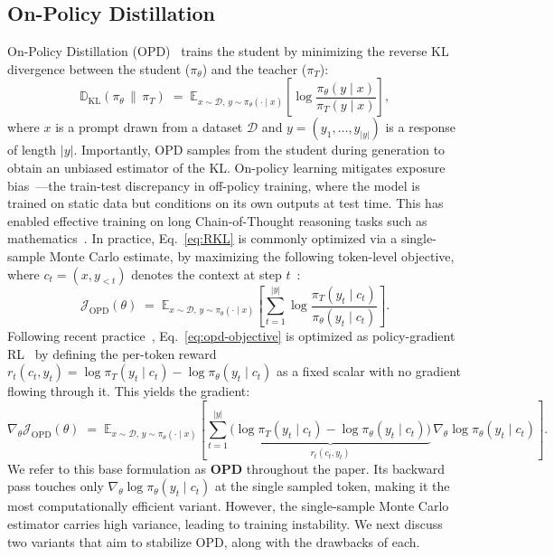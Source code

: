 \documentclass{article}
\begin{document}
\subsection{On-Policy Distillation}
\label{sec:opd}
On-Policy Distillation (OPD)~\citep{agarwal2024onpolicy,gu2024minillm} trains the student by minimizing the reverse KL divergence between the student ($\pi_\theta$) and the teacher ($\pi_T$):
\begin{equation}
\label{eq:RKL}
\mathbb{D}_\mathrm{KL}\!\left(\pi_\theta \,\|\, \pi_T\right)
\;=\;
\mathbb{E}_{x\sim \mathcal{D},\, y\sim \pi_\theta(\cdot\mid x)}
\!\left[\log \frac{\pi_\theta(y\mid x)}{\pi_T(y\mid x)}\right],
\end{equation}
where $x$ is a prompt drawn from a dataset $\mathcal{D}$ and $y = (y_1, \ldots, y_{|y|})$ is a response of length $|y|$. Importantly, OPD samples from the student during generation to obtain an unbiased estimator of the KL.  On-policy learning mitigates exposure bias~\citep{ranzato2015exposurebias}---the train-test discrepancy in off-policy training, where the model is trained on static data but conditions on its own outputs at test time. This has enabled effective training on long Chain-of-Thought reasoning tasks such as mathematics~\citep{wei2022chain,yang2025qwen3,lu2025onpolicydistillation}. In practice, Eq.~\eqref{eq:RKL} is commonly optimized via a single-sample Monte Carlo estimate, by maximizing the following token-level objective, where $c_t = (x, y_{<t})$ denotes the context at step $t$~\citep{lu2025onpolicydistillation}:
\begin{equation}
\label{eq:opd-objective}
\mathcal{J}_\text{OPD}(\theta)
\;=\;
\mathbb{E}_{x\sim\mathcal{D},\, y \sim \pi_\theta(\cdot\mid x)}
\!\left[\sum_{t=1}^{|y|} \log \frac{\pi_T(y_t \mid c_t)}{\pi_\theta(y_t \mid c_t)}\right].
\end{equation}
Following recent practice~\citep{lu2025onpolicydistillation, zeng2026glm, ko2026scaling}, Eq.~\eqref{eq:opd-objective} is optimized as policy-gradient 
RL~\citep{williams1992simple, sutton1999policygrad} by defining the per-token 
reward $r_t(c_t, y_t) = \log \pi_T(y_t \mid c_t) - \log \pi_\theta(y_t \mid c_t)$  as a fixed scalar with no gradient flowing through it. This yields the gradient:
\begin{equation}
\label{eq:opd-gradient}
\nabla_\theta \mathcal{J}_\text{OPD}(\theta)
\;=\;
\mathbb{E}_{x\sim\mathcal{D},\, y\sim \pi_\theta(\cdot\mid x)}
\!\left[\sum_{t=1}^{|y|}
\underbrace{\bigl(\log \pi_T(y_t \mid c_t) - \log \pi_\theta(y_t \mid c_t)\bigr)}_{\textstyle r_t(c_t,y_t)}
\,\nabla_\theta \log \pi_\theta(y_t \mid c_t)\right].
\end{equation}
We refer to this base formulation as \textbf{OPD} throughout the paper. Its backward pass touches only $\nabla_\theta\log \pi_\theta(y_t\mid c_t)$ at the single sampled token, making it the most computationally efficient variant. However, the single-sample Monte Carlo estimator carries high variance, leading to training instability. We next discuss two variants that aim to stabilize OPD, along with the drawbacks of each.
\end{document}
